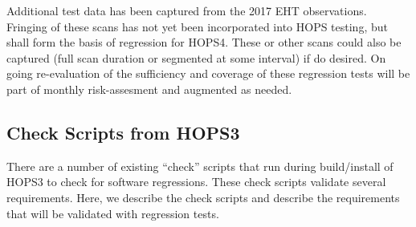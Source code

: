 Additional test data has been captured from the 2017 \ac{EHT} observations.  Fringing of these scans has not yet been incorporated into HOPS testing, but shall form the basis of regression for HOPS4. These or other scans could also be captured (full scan duration or segmented at some interval) if do desired. On going re-evaluation of the sufficiency and coverage of these regression tests will be part of monthly risk-assesment and augmented as needed.

\subsection{Check Scripts from HOPS3}
\label{sec:regresscheck}


There are a number of existing ``check'' scripts that run during build/install of HOPS3 to check for software regressions. These check scripts validate several requirements. Here, we describe the check scripts and describe the requirements that will be validated with regression tests.


